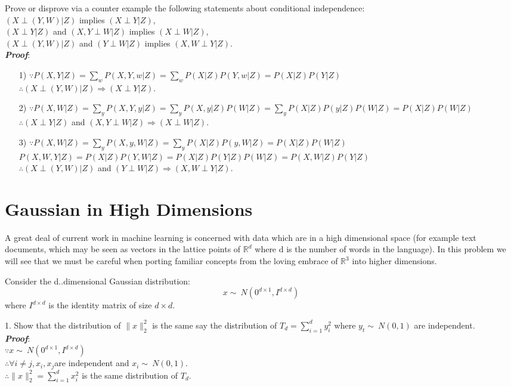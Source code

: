 \documentclass{article}
\theoremstyle{definition}
\theoremstyle{definition}
\theoremstyle{remark}
\begin{document}
Prove or disprove via a counter example the following statements about conditional independence:\\
$(X\perp (Y,W)|Z)$ implies $(X\perp Y|Z)$,\\
$(X\perp Y|Z)$ and $(X,Y\perp W|Z)$ implies $(X\perp W|Z)$,\\
$(X\perp (Y,W)|Z)$ and $(Y\perp W|Z)$ implies $(X,W\perp Y|Z)$.\\
\emph{\textbf{Proof}}:
\begin{enumerate}
\item[1)] $\because P(X,Y|Z)=\sum_{w}P(X, Y, w|Z)=\sum_{w}P(X|Z)P(Y,w|Z)=P(X|Z)P(Y|Z)$\\
    $\therefore(X\perp (Y,W)|Z) \Rightarrow (X\perp Y|Z)$.
\item[2)] $\because P(X,W|Z)=\sum_{y}P(X, Y, y|Z)=\sum_{y}P(X,y|Z)P(W|Z)=\sum_{y}P(X|Z)P(y|Z)P(W|Z)=P(X|Z)P(W|Z)$\\
    $\therefore(X\perp Y|Z)$ and $(X,Y\perp W|Z) \Rightarrow (X\perp W|Z)$.
\item[3)] $\because P(X,W|Z)=\sum_{y}P(X,y,W|Z)=\sum_{y}P(X|Z)P(y,W|Z)=P(X|Z)P(W|Z)$\\
    $P(X,W,Y|Z)=P(X|Z)P(Y,W|Z)=P(X|Z)P(Y|Z)P(W|Z)=P(X,W|Z)P(Y|Z)$\\
    $\therefore(X\perp (Y,W)|Z)$ and $(Y\perp W|Z) \Rightarrow (X,W\perp Y|Z)$.
\end{enumerate}

\section*{Gaussian in High Dimensions}

A great deal of current work in machine learning is concerned with data which are in a high dimensional
space (for example text documents, which may be seen as vectors in the lattice points of $\mathbb{R}^d$
where d is the number of words in the language). In this problem we will see that we must be careful when porting familiar
concepts from the loving embrace of $\mathbb{R}^3$ into higher dimensions.

Consider the d..dimensional Gaussian distribution:
\[
x\sim ~N(0^{d\times 1}, I^{d\times d})
\]
where $I^{d\times d}$ is the identity matrix of size $d\times d$.

1. Show that the distribution of $\lVert x \rVert_2^2$ is the same say the distribution of $T_d=\sum_{i=1}^d y_i^2$ where $y_t\sim ~N(0,1)$ are independent.\\
\emph{\textbf{Proof}}:\\
$\because x\sim ~N(0^{d\times 1}, I^{d\times d})$\\
$\therefore \forall i\neq j, x_i,x_j$are independent and $x_i\sim ~N(0,1).$\\
$\therefore \lVert x \rVert_2^2 = \sum_{i=1}^d x_i^2$ is the same distribution of $T_d$.
\end{document}
